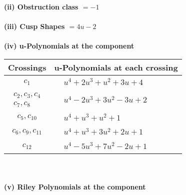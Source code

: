 \documentclass[1p]{elsarticle_modified}
\theoremstyle{definition}
\begin{document}
\flushleft \textbf{(ii) Obstruction class $= -1$}\\~\\
\flushleft \textbf{(iii) Cusp Shapes $= 4 u-2$}\\~\\
\newpage\renewcommand{\arraystretch}{1}
\flushleft \textbf{(iv) u-Polynomials at the component}\newline \\
\begin{tabular}{m{50pt}|m{274pt}}
Crossings & \hspace{64pt}u-Polynomials at each crossing \\
\hline $$\begin{aligned}c_{1}\end{aligned}$$&$\begin{aligned}
&u^4+2 u^3+u^2+3 u+4
\end{aligned}$\\
\hline $$\begin{aligned}c_{2},c_{3},c_{4}\\c_{7},c_{8}\end{aligned}$$&$\begin{aligned}
&u^4-2 u^3+3 u^2-3 u+2
\end{aligned}$\\
\hline $$\begin{aligned}c_{5},c_{10}\end{aligned}$$&$\begin{aligned}
&u^4+u^3+u^2+1
\end{aligned}$\\
\hline $$\begin{aligned}c_{6},c_{9},c_{11}\end{aligned}$$&$\begin{aligned}
&u^4+u^3+3 u^2+2 u+1
\end{aligned}$\\
\hline $$\begin{aligned}c_{12}\end{aligned}$$&$\begin{aligned}
&u^4-5 u^3+7 u^2-2 u+1
\end{aligned}$\\
\hline
\end{tabular}\\~\\
\newpage\renewcommand{\arraystretch}{1}
\flushleft \textbf{(v) Riley Polynomials at the component}\newline \\
\end{document}
